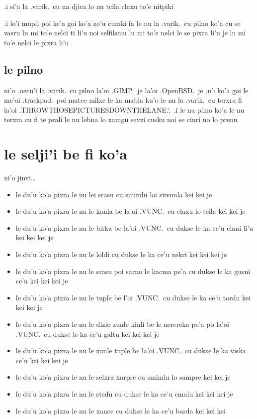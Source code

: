 \documentclass{report}
\newcommand\sds{\spacefactor\sfcode`.\ \space}
\begin{document}
.i si'a la .varik.\ cu na djica lo nu tcila claxu to'e nitpiki

.i lo'i mupli poi ke'a goi ko'a zo'u cumki fa le nu la .varik.\ cu pilno ko'a cu se vasru lu mi to'e nelci ti li'u noi selfilsmu lu mi to'e nelci le se pixra li'u je lu mi to'e nelci le pixra li'u

\subsection{le pilno}
ni'o .uecu'i la .varik.\ cu pilno la'oi .GIMP.\ je la'oi .OpenBSD.\ je .u'i ko'a goi le me'oi .trackpad.\ poi mutce milxe le ka mabla ku'o le nu la .varik.\ cu terxra fi la'oi .THROWTHOSEPICTURESDOWNTHELANE.\sds  .i le nu pilno ko'a le nu terxra cu fi te prali le nu lebna lo xamgu sevzi cusku noi se cinri no lo prenu

\section{le selji'i be fi ko'a}
ni'o jinvi\ldots
\begin{itemize}
	\item le du'u ko'a pixra le nu lei srasu cu smimlu loi sirsunla kei kei je
	\item le du'u ko'a pixra le nu le kanla be la'oi .VUNC.\ cu claxu lo tcila kei kei je
	\item le du'u ko'a pixra le nu le birka be la'oi .VUNC.\ cu dukse le ka ce'u clani li'u kei kei kei je
	\item le du'u ko'a pixra le nu le loldi cu dukse le ka ce'u xekri kei kei kei je
	\item le du'u ko'a pixra le nu le srasu poi sarno le kacma pe'a cu dukse le ka gusni ce'u kei kei kei je
	\item le du'u ko'a pixra le nu le tuple be l'oi .VUNC.\ cu dukse le ka ce'u tordu kei kei kei je
	\item le du'u ko'a pixra le nu le dizlo zunle kinli be le nercreka pe'a po la'oi .VUNC.\ cu dukse le ka ce'u galtu kei kei kei je
	\item le du'u ko'a pixra le nu le zunle tuple be la'oi .VUNC.\ cu dukse le ka viska ce'u kei kei kei je
	\item le du'u ko'a pixra le nu le selxra xarpre cu smimlu lo sampre kei kei je
	\item le du'u ko'a pixra le nu le stedu cu dukse le ka ce'u cmalu kei kei kei je
	\item le du'u ko'a pixra le nu le xance cu dukse le ka ce'u barda kei kei kei
\end{itemize}
\end{document}
